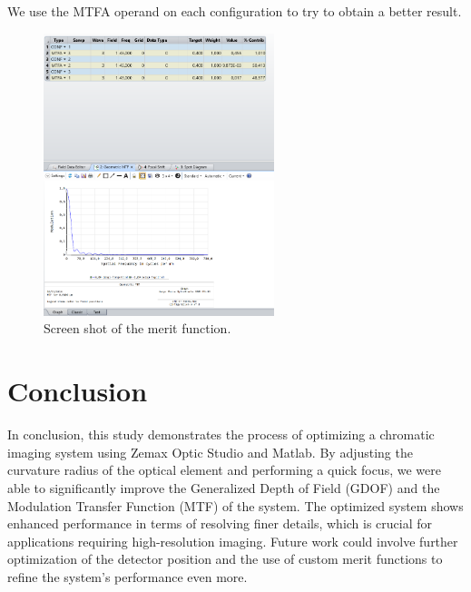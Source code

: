 \documentclass[10pt,letterpaper]{article}
\begin{document}
We use the MTFA operand on each configuration to try to obtain a better result.

\begin{figure}[h]
    \centering
    \includegraphics[width=0.6\textwidth]{Merit funtion.png}
    \caption{Screen shot of the merit function.}
    \label{fig:merit-function}
\end{figure}

\pagebreak
\section{Conclusion}
In conclusion, this study demonstrates the process of optimizing a chromatic imaging system using Zemax Optic Studio and Matlab. By adjusting the curvature radius of the optical element and performing a quick focus, we were able to significantly improve the Generalized Depth of Field (GDOF) and the Modulation Transfer Function (MTF) of the system. The optimized system shows enhanced performance in terms of resolving finer details, which is crucial for applications requiring high-resolution imaging. Future work could involve further optimization of the detector position and the use of custom merit functions to refine the system's performance even more.
\vspace{
    1cm
}
\listoffigures
\end{document}

